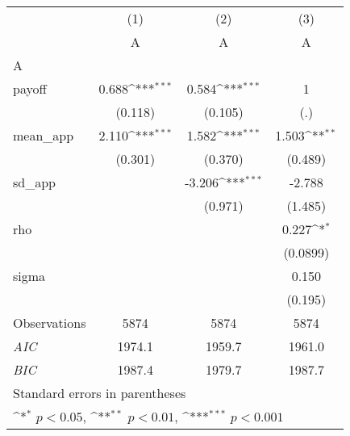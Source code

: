 {
\def\sym#1{\ifmmode^{#1}\else\(^{#1}\)\fi}
\begin{tabular}{l*{3}{c}}
\hline\hline
                    &\multicolumn{1}{c}{(1)}&\multicolumn{1}{c}{(2)}&\multicolumn{1}{c}{(3)}\\
                    &\multicolumn{1}{c}{A}&\multicolumn{1}{c}{A}&\multicolumn{1}{c}{A}\\
\hline
A                   &                     &                     &                     \\
payoff              &       0.688\sym{***}&       0.584\sym{***}&           1         \\
                    &     (0.118)         &     (0.105)         &         (.)         \\
[1em]
mean\_app            &       2.110\sym{***}&       1.582\sym{***}&       1.503\sym{**} \\
                    &     (0.301)         &     (0.370)         &     (0.489)         \\
[1em]
sd\_app              &                     &      -3.206\sym{***}&      -2.788         \\
                    &                     &     (0.971)         &     (1.485)         \\
[1em]
rho                 &                     &                     &       0.227\sym{*}  \\
                    &                     &                     &    (0.0899)         \\
[1em]
sigma               &                     &                     &       0.150         \\
                    &                     &                     &     (0.195)         \\
\hline
Observations        &        5874         &        5874         &        5874         \\
\textit{AIC}        &      1974.1         &      1959.7         &      1961.0         \\
\textit{BIC}        &      1987.4         &      1979.7         &      1987.7         \\
\hline\hline
\multicolumn{4}{l}{\footnotesize Standard errors in parentheses}\\
\multicolumn{4}{l}{\footnotesize \sym{*} \(p<0.05\), \sym{**} \(p<0.01\), \sym{***} \(p<0.001\)}\\
\end{tabular}
}
